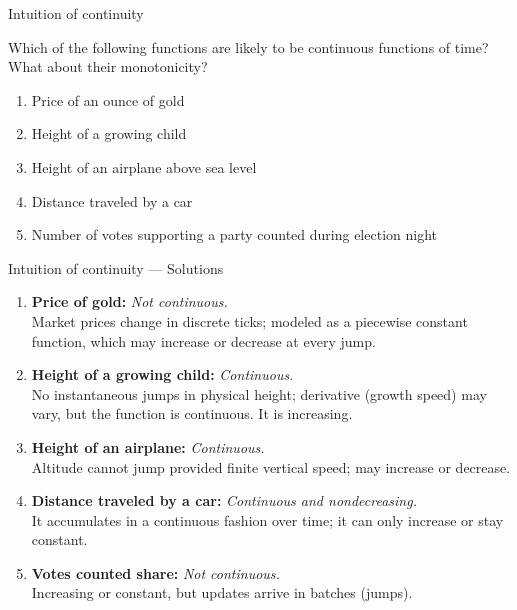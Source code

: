 \documentclass[9pt]{beamer}
\begin{document}
\begin{frame}{Intuition of continuity}

    Which of the following functions are likely to be continuous functions of time? What about their monotonicity?
    \begin{enumerate}[leftmargin = 0.5cm, label = (\alph*), rightmargin = 0.2cm]
        \item Price of an ounce of gold
        \item Height of a growing child
        \item Height of an airplane above sea level
        \item Distance traveled by a car
        \item Number of votes supporting a party counted during election night
    \end{enumerate}
    
\end{frame}

\begin{frame}{Intuition of continuity — Solutions}

\small
\begin{enumerate}[leftmargin=0.5cm, label=(\alph*), rightmargin=0.2cm]

\item \textbf{Price of gold:} \emph{Not continuous.}\\
Market prices change in discrete ticks; modeled as a piecewise constant function, which may increase or decrease at every jump.

\item \textbf{Height of a growing child:} \emph{Continuous.} \\
No instantaneous jumps in physical height; derivative (growth speed) may vary, but the function is continuous. It is increasing.

\item \textbf{Height of an airplane:} \emph{Continuous.}\\
Altitude cannot jump provided finite vertical speed; may increase or decrease.

\item \textbf{Distance traveled by a car:} \emph{Continuous and nondecreasing.}\\
It accumulates in a continuous fashion over time; it can only increase or stay constant.

\item \textbf{Votes counted share:} \emph{Not continuous.} \\
Increasing or constant, but updates arrive in batches (jumps).

\end{enumerate}

\end{frame}
\end{document}
